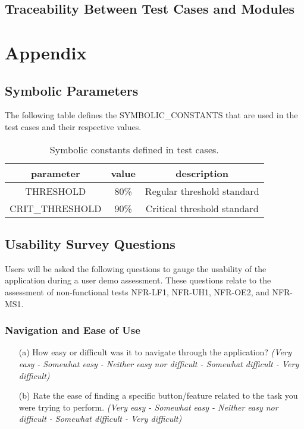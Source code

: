 \documentclass[12pt, titlepage]{article}
\begin{document}
\subsection{Traceability Between Test Cases and Modules}

				
%

%

\newpage

\section{Appendix}

\subsection{Symbolic Parameters}

The following table defines the SYMBOLIC\_CONSTANTS that are used in the test
cases and their respective values.

\bigskip

\begin{table}[htb]
\caption{Symbolic constants defined in test cases.}
\centering
\begin{tabular}{c c c}
  \toprule
  \textbf{parameter} & \textbf{value} & \textbf{description}\\
  \midrule 
  THRESHOLD & 80\% & Regular threshold standard\\
  CRIT\_THRESHOLD & 90\% & Critical threshold standard\\
  \bottomrule
\end{tabular}
\end{table}

\subsection{Usability Survey Questions}

Users will be asked the following questions to gauge the usability of the
application during a user demo assessment. These questions relate to
the assessment of non-functional tests NFR-LF1, NFR-UH1, NFR-OE2, and NFR-MS1.

\subsubsection*{\textbf{Navigation and Ease of Use}}
  \begin{itemize}
    \item[(a)] How easy or difficult was it to navigate through the
    application? \textit{(Very easy - Somewhat easy - Neither easy nor difficult
    - Somewhat difficult - Very difficult)}
    \item[(b)] Rate the ease of finding a specific button/feature related to the
    task you were trying to perform. \textit{(Very easy - Somewhat easy -
    Neither easy nor difficult - Somewhat difficult - Very difficult)}
  \end{itemize}
\end{document}
